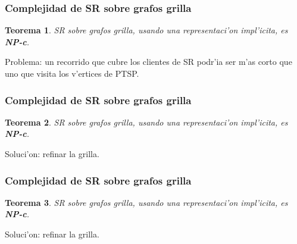 \documentclass{beamer}
\newcommand{\class}[1]{\textnormal{\textbf{#1}}}
\newcommand{\probl}[1]{\textnormal{\textsf{#1}}}
\newtheorem*{thm}{Teorema}
\begin{document}
\begin{frame}
\frametitle{Complejidad de \probl{SR} sobre grafos grilla}

\begin{thm}
\probl{SR} sobre grafos grilla, usando una representaci'on impl'icita, es \class{NP-c}.
\end{thm}

\pause

\vspace{3mm}

Problema: un recorrido que cubre los clientes de \probl{SR} podr'ia ser m'as corto que uno que visita los v'ertices de \probl{PTSP}.

\pause

\begin{figure}
	\begin{center}
		
	\end{center}	
\end{figure}

\end{frame}

\begin{frame}
\frametitle{Complejidad de \probl{SR} sobre grafos grilla}

\begin{thm}
\probl{SR} sobre grafos grilla, usando una representaci'on impl'icita, es \class{NP-c}.
\end{thm}

Soluci'on: refinar la grilla.

\pause

\vspace{3mm}

\begin{figure}
	\begin{center}
		
	\end{center}	
\end{figure}

\end{frame}

\begin{frame}
\frametitle{Complejidad de \probl{SR} sobre grafos grilla}

\begin{thm}
\probl{SR} sobre grafos grilla, usando una representaci'on impl'icita, es \class{NP-c}.
\end{thm}

Soluci'on: refinar la grilla.

\vspace{3mm}

\begin{figure}
	\begin{center}
		
	\end{center}	
\end{figure}

\end{frame}
\end{document}
